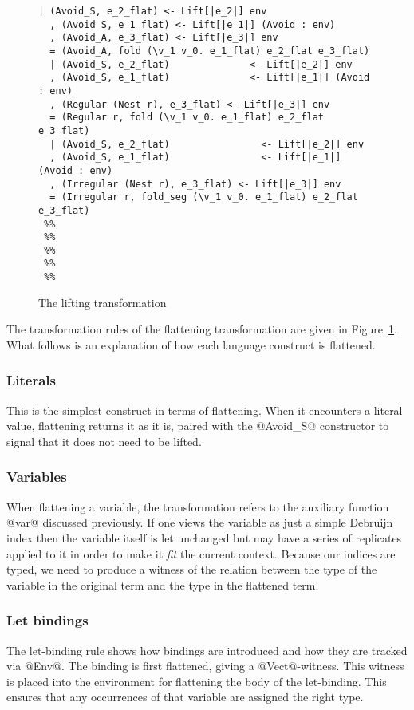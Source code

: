 \begin{figure}
\begin{lstlisting}[multicols=2,style=ndp]
  | (Avoid_S, e_2_flat) <- Lift[|e_2|] env
  , (Avoid_S, e_1_flat) <- Lift[|e_1|] (Avoid : env)
  , (Avoid_A, e_3_flat) <- Lift[|e_3|] env
  = (Avoid_A, fold (\v_1 v_0. e_1_flat) e_2_flat e_3_flat)
  | (Avoid_S, e_2_flat)              <- Lift[|e_2|] env
  , (Avoid_S, e_1_flat)              <- Lift[|e_1|] (Avoid : env)
  , (Regular (Nest r), e_3_flat) <- Lift[|e_3|] env
  = (Regular r, fold (\v_1 v_0. e_1_flat) e_2_flat e_3_flat)
  | (Avoid_S, e_2_flat)                <- Lift[|e_2|] env
  , (Avoid_S, e_1_flat)                <- Lift[|e_1|] (Avoid : env)
  , (Irregular (Nest r), e_3_flat) <- Lift[|e_3|] env
  = (Irregular r, fold_seg (\v_1 v_0. e_1_flat) e_2_flat e_3_flat)
 %%
 %%
 %%
 %%
 %%
\end{lstlisting}
\caption{The lifting transformation}
\label{fig:lifting-transform}
\end{figure}

The transformation rules of the flattening transformation are given in Figure~\ref{fig:lifting-transform}. What follows is an explanation of how each language construct is flattened.

\subsubsection{Literals}
This is the simplest construct in terms of flattening. When it encounters a literal value, flattening returns it as it is, paired with the @Avoid_S@ constructor to signal that it does not need to be lifted.

\subsubsection{Variables }
When flattening a variable, the transformation refers to the auxiliary function @var@ discussed previously. If one views the variable as just a simple Debruijn index then the variable itself is let unchanged but may have a series of replicates applied to it in order to make it \emph{fit} the current context. Because our indices are typed, we need to produce a witness of the relation between the type of the variable in the original term and the type in the flattened term.

\subsubsection{Let bindings}
The let-binding rule shows how bindings are introduced and how they are tracked via @Env@. The binding is first flattened, giving a @Vect@-witness. This witness is placed into the environment for flattening the body of the let-binding. This ensures that any occurrences of that variable are assigned the right type.

